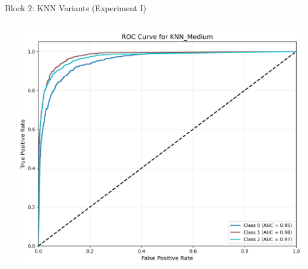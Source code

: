 \documentclass[9pt]{beamer}
\begin{document}
\begin{frame}{Block 2: KNN Variants (Experiment I)}
\begin{columns}
\begin{column}{0.33\textwidth}
        \end{column}
        \begin{column}{0.33\textwidth}
            \centering
            \includegraphics[width=\textwidth]{code/ResultsMainAugZip/plots/Block2_KNN_Variants_Experiment_I/roc_curve_KNN_Medium.png}
        \end{column}
    \end{columns}
    \end{frame}
    
\end{document}
